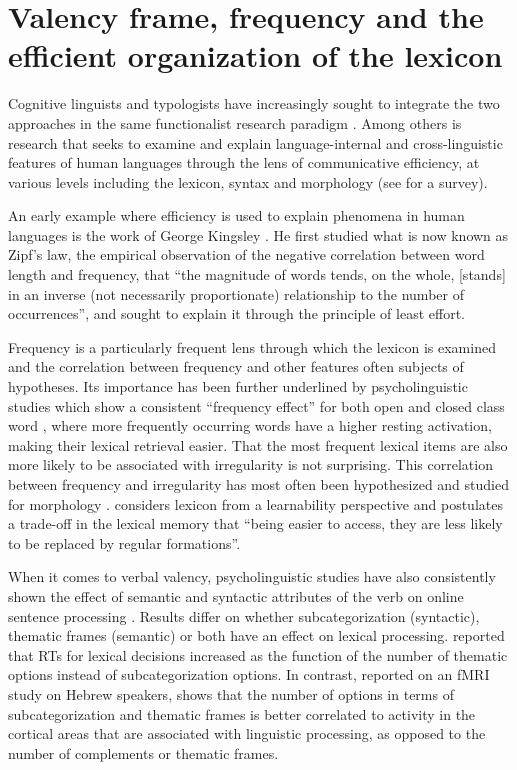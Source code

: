 \section{Valency frame, frequency and the efficient organization of the lexicon}\label{sec:entropy-background}

Cognitive linguists and typologists have increasingly sought to integrate the two approaches in the same functionalist research paradigm \citep{croft2016}. Among others is research that seeks to examine and explain language-internal and cross-linguistic features of human languages through the lens of communicative efficiency, at various levels including the lexicon, syntax and morphology (see \citealp{gibson2019} for a survey). 

An early example where efficiency is used to explain phenomena in human languages is the work of George Kingsley \citet{zipf1935,zipf1949}. He first studied what is now known as Zipf's law, the empirical observation of the negative correlation between word length and frequency, that ``the magnitude of words tends, on the whole, [stands] in an inverse (not necessarily proportionate) relationship to the number of occurrences'', and sought to explain it through the principle of least effort.

Frequency is a particularly frequent lens through which the lexicon is examined and the correlation between frequency and other features often subjects of hypotheses. Its importance has been further underlined by psycholinguistic studies which show a consistent ``frequency effect'' for both open and closed class word \citep{segui1982,marslen-wilson1990}, where more frequently occurring words have a higher resting activation, making their lexical retrieval easier. That the most frequent lexical items are also more likely to be associated with irregularity is not surprising. This correlation between frequency and irregularity has most often been hypothesized and studied for morphology \citet{wu2019}. \citet{bybee1998} considers lexicon from a learnability perspective and postulates a trade-off in the lexical memory that ``being easier to access, they are less likely to be replaced by regular formations''. 

When it comes to verbal valency, psycholinguistic studies have also consistently shown the effect of semantic and syntactic attributes of the verb on online sentence processing \citep{shapiro1987,collina2001}. Results differ on whether subcategorization (syntactic), thematic frames (semantic) or both have an effect on lexical processing. \citet{shapiro1987} reported that RTs for lexical decisions increased as the function of the number of thematic options instead of subcategorization options. In contrast, \citet{shetreet2007} reported on an fMRI study on Hebrew speakers, shows that the number of options in terms of subcategorization and thematic frames is better correlated to activity in the cortical areas that are associated with linguistic processing, as opposed to the number of complements or thematic frames.

